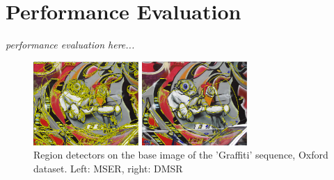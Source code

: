 \documentclass{article}
\begin{document}
\section{Performance  Evaluation}
\label{sec:perf}
{\em performance evaluation here...}
\begin{figure}[htb]

\begin{minipage}[b]{.49\linewidth}
  \centering
  \centerline{\includegraphics[width=4.0cm]{./Figs/mserGraffiti1}}
\end{minipage}
\hfill
\begin{minipage}[b]{0.49\linewidth}
  \centering
  \centerline{\includegraphics[width=4.0cm]{./Figs/dmsrGraffiti1}}
\end{minipage}
\vspace{-0.25cm}
\caption{Region detectors on the base image of the 'Graffiti' sequence, Oxford dataset. Left: MSER, right: DMSR}
\label{fig:det_graffiti}
%
\end{figure}
\end{document}
